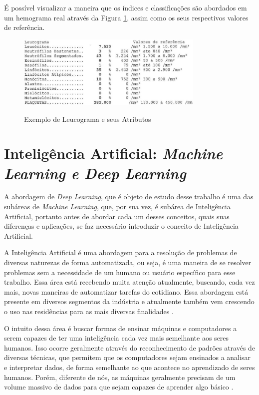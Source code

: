 É possível visualizar a maneira que os índices e classificações são abordados em um hemograma real através da Figura \ref{fig:leucograma}, assim como os seus respectivos valores de referência.

\begin{figure}[!htb]
	\centering
	\caption{Exemplo de Leucograma e seus Atributos}
	\includegraphics[width=0.80\textwidth]{img/leucograma.jpg}
	\label{fig:leucograma}
\end{figure}

\section{Inteligência Artificial: \emph{Machine Learning e Deep Learning}}
\label{sec:conceito2}
A abordagem de \emph{Deep Learning}, que é objeto de estudo desse trabalho é uma das subáreas de \emph{Machine Learning}, que, por sua vez, é subárea de Inteligência Artificial, portanto antes de abordar cada um desses conceitos, quais suas diferenças e aplicações, se faz necessário introduzir o conceito de Inteligência Artificial.

A Inteligência Artificial é uma abordagem para a resolução de problemas de diversas naturezas de forma automatizada, ou seja, é uma maneira de se resolver problemas sem a necessidade de um humano ou usuário específico para esse trabalho. Essa área está recebendo muita atenção atualmente, buscando, cada vez mais, novas maneiras de automatizar tarefas do cotidiano. Essa abordagem está presente em diversos segmentos da indústria e atualmente também vem crescendo o uso nas residências para as mais diversas finalidades \cite{inteligenciaArtificial}.

O intuito dessa área é buscar formas de ensinar máquinas e computadores a serem capazes de ter uma inteligência cada vez mais semelhante aos seres humanos. Isso ocorre geralmente através do reconhecimento de padrões através de diversas técnicas, que permitem que os computadores sejam ensinados a analisar e interpretar dados, de forma semelhante ao que acontece no aprendizado de seres humanos. Porém, diferente de nós, as máquinas geralmente precisam de um volume massivo de dados para que sejam capazes de aprender algo básico \cite{IAAprendizadoMaquina}.

